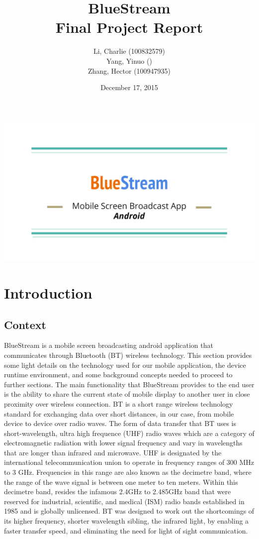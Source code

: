 \documentclass[a4paper,12pt]{article}
\title{BlueStream \\ Final Project Report}
\author{Li, Charlie (100832579) \\ Yang, Yinuo () \\ Zhang, Hector (100947935) }
\date{December 17, 2015}
\begin{document}
\maketitle

\includegraphics[scale=.2]{BlueStream.jpg}
\newpage
\tableofcontents
\newpage
\section{Introduction}


\subsection{Context}
BlueStream is a mobile screen broadcasting android application that communicates through Bluetooth (BT) wireless technology. This section provides some light details on the technology used for our mobile application, the device runtime environment, and some background concepts needed to proceed to further sections. The main functionality that BlueStream provides to the end user is the ability to share the current state of mobile display to another user in close proximity over wireless connection. BT is a short range wireless technology standard for exchanging data over short distances, in our case, from mobile device to device over radio waves. The form of data transfer that BT uses is short-wavelength, ultra high frequence (UHF) radio waves which are a category of electromagnetic radiation with lower signal frequency and vary in wavelengths that are longer than infrared and microwave. UHF is designated by the international telecommunication union to operate in frequency ranges of 300 MHz to 3 GHz. Frequencies in this range are also known as the decimetre band, where the range of the wave signal is between one meter to ten meters. Within this decimetre band, resides the infamous 2.4GHz to 2.485GHz band that were reserved for industrial, scientific, and medical (ISM) radio bands established in 1985 and is globally unlicensed. BT was designed to work out the shortcomings of its higher frequency, shorter wavelength sibling, the infrared light, by enabling a faster transfer speed, and eliminating the need for light of sight communication.
\end{document}
